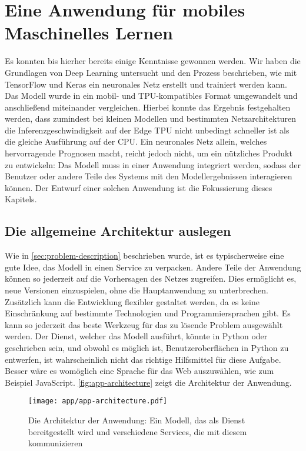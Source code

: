 \chapter{Eine Anwendung für mobiles Maschinelles Lernen}
\label{chap:application}
Es konnten bis hierher bereits einige Kenntnisse gewonnen
werden. Wir haben die Grundlagen von Deep Learning untersucht
und den Prozess beschrieben, wie mit TensorFlow und Keras
ein neuronales Netz erstellt und trainiert werden kann.
Das Modell wurde in ein mobil- und TPU-kompatibles Format umgewandelt
und anschließend miteinander vergleichen.
Hierbei konnte das Ergebnis festgehalten werden,
dass zumindest bei kleinen Modellen und bestimmten Netzarchitekturen
die Inferenzgeschwindigkeit
auf der Edge TPU nicht unbedingt schneller ist als die gleiche Ausführung auf der CPU.
Ein neuronales Netz allein, welches hervorragende Prognosen
macht, reicht jedoch nicht, um ein nützliches Produkt zu entwickeln:
Das Modell muss in einer Anwendung integriert werden, sodass
der Benutzer oder andere Teile des Systems
mit den Modellergebnissen interagieren können.
Der Entwurf einer solchen Anwendung ist die
Fokussierung dieses Kapitels.

\section{Die allgemeine Architektur auslegen}
Wie in \autoref{sec:problem-description} beschrieben wurde, ist es
typischerweise eine gute Idee, das Modell in einen Service zu verpacken.
Andere Teile der Anwendung können so jederzeit auf die Vorhersagen
des Netzes zugreifen. Dies ermöglicht es, neue Versionen
einzuspielen, ohne die Hauptanwendung zu unterbrechen.
Zusätzlich kann die Entwicklung flexibler gestaltet werden,
da es keine Einschränkung auf bestimmte Technologien
und Programmiersprachen gibt. Es kann so jederzeit das
beste Werkzeug für das zu lösende Problem ausgewählt werden.
Der Dienst, welcher das Modell ausführt, könnte in Python oder \cpp{}
geschrieben sein, und obwohl es möglich ist, Benutzeroberflächen 
in Python zu entwerfen, ist \cpp{} wahrscheinlich nicht das
richtige Hilfsmittel für diese Aufgabe.
Besser wäre es womöglich eine Sprache für das Web auszuwählen, 
wie zum Beispiel JavaScript.
\autoref{fig:app-architecture} zeigt die Architektur der Anwendung.
\begin{figure}[h!]
  \centering
  \texttt{[image: app/app-architecture.pdf]}
  \caption{Die Architektur der Anwendung: Ein Modell, das als Dienst
  bereitgestellt wird und verschiedene Services, die mit diesem kommunizieren}
  \label{fig:app-architecture}
\end{figure}

